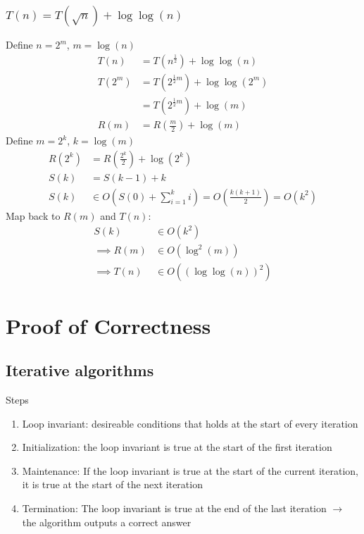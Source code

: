 \documentclass[9pt]{extarticle}
\begin{document}
\subsubsection{$T(n) = T(\sqrt{n}) + \log\log(n)$}
Define $n = 2^m$, $m = \log(n)$ 
\begin{align*}
    T(n) &= T(n^{\frac{1}{2}}) + \log\log(n)\\
    T(2^m) &= T(2^{\frac{1}{2} m}) + \log\log(2^m)\\
    &= T(2^{\frac{1}{2} m}) + \log(m)\\
    R(m) &= R(\frac{m}{2}) + \log(m)
\end{align*}
Define $m = 2^k$, $k = \log(m)$
\begin{align*}
    R(2^k) &= R(\frac{2^k}{2}) + \log(2^k)\\
    S(k) &= S(k-1) + k\\
    S(k) &\in O(S(0) + \sum_{i=1}^{k} i) = O(\frac{k(k + 1)}{2}) = O(k^2)
\end{align*}
Map back to $R(m)$ and $T(n)$:
\begin{align*}
    S(k) &\in O(k^2)\\
    \implies R(m) &\in O(\log^2(m))\\
    \implies T(n) &\in O((\log\log(n))^2)
\end{align*}

\newpage
\section{Proof of Correctness}
\subsection{Iterative algorithms}
Steps
\begin{enumerate}
    \item Loop invariant: desireable conditions that holds at the start of every iteration
    \item Initialization: the loop invariant is true at the start of the first iteration
    \item Maintenance: If the loop invariant is true at the start of the current iteration, it is true at the start of the next iteration
    \item Termination: The loop invariant is true at the end of the last iteration $\rightarrow$ the algorithm outputs a correct answer
\end{enumerate}
\end{document}
